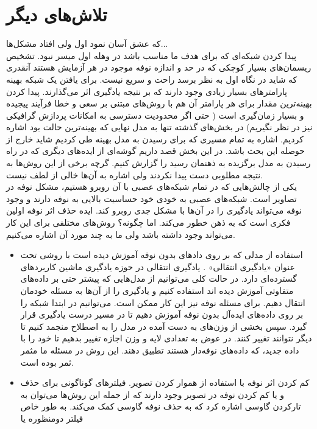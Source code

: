 {\section{تلاش‌های دیگر} 
که عشق آسان نمود اول ولی افتاد مشکل‌ها... \\
پیدا کردن شبکه‌ای که برای هدف ما مناسب باشد در وهله اول میسر نبود. تشخیص ریسمان‌های بسیار کوچکی که در حد و اندازه نوفه موجود در هر آزمایش 	هستند آنقدری که شاید در نگاه اول به نظر برسد راحت و سریع نیست. برای یافتن یک شبکه بهینه پارامترهای بسیار زیادی وجود دارند که بر نتیجه یادگیری اثر می‌گذارند. پیدا کردن بهینه‌ترین مقدار برای هر پارامتر آن هم با روش‌های مبتنی بر سعی و خطا فرآیند پیجیده و بسیار زمان‌گیری است ( حتی اگر محدودیت دسترسی به امکانات پردازش گرافیکی نیز در نظر نگیریم)  در بخش‌های گذشته تنها به مدل نهایی که بهینه‌ترین حالت بود اشاره کردیم. اشاره به تمام‌ مسیری که برای رسیدن به مدل بهینه طی کردیم شاید خارج از حوصله این بحث باشد. در این بخش قصد داریم گوشه‌ای از ایده‌های دیگری که در راه رسیدن به مدل برگزیده به ذهنمان رسید را گزارش کنیم. گرچه برخی از این روش‌ها به نتیجه مطلوبی دست پیدا نکردند ولی اشاره به آن‌ها خالی از لطف نیست. \\
یکی از چالش‌هایی که در تمام شبکه‌های عصبی با آن روبرو هستیم، مشکل نوفه در تصاویر است. شبکه‌های عصبی به خودی خود حساسیت بالایی به نوفه دارند و وجود نوفه می‌تواند یادگیری را در آن‌ها با مشکل جدی روبرو کند. ایده حذف اثر نوفه اولین فکری است که به ذهن خطور می‌کند. اما چگونه؟ روش‌های مختلفی برای این کار می‌تواند وجود داشته باشد ولی ما به چند مورد آن اشاره می‌کنیم. 
\begin{itemize}
	\item 
	استفاده از مدلی که بر روی داد‌های بدون نوفه آموزش دیده است با روشی تحت عنوان «یادگیری انتقالی»
	.
	یادگیری انتقالی در حوزه یادگیری ماشین کاربردهای گسترده‌ای دارد. در حالت کلی می‌توانیم از مدل‌هایی که پیشتر حتی بر داده‌های متفاوتی آموزش دیده اند استفاده کنیم و یادگیری را از آن‌ها به مسئله خودمان انتقال دهیم. برای مسئله نوفه نیز این کار ممکن است. می‌توانیم در ابتدا شبکه را بر روی داده‌های ایده‌آل بدون نوفه آموزش دهیم تا در مسیر درست یادگیری قرار گیرد. سپس بخشی از وزن‌های به دست آمده در مدل را به اصطلاح منجمد کنیم تا دیگر نتوانند تغییر کنند. در عوض به تعدادی لایه و وزن اجازه تغییر بدهیم تا خود را با داده جدید، که داده‌های نوفه‌دار هستند تطبیق دهند. این روش در مسئله ما مثمر ثمر بوده است.
	\item
	کم کردن اثر نوفه با استفاده از هموار کردن تصویر. فیلتر‌های گوناگونی برای حذف و یا کم کردن نوفه در تصویر وجود دارند که از جمله این روش‌ها می‌توان به تارکردن گاوسی 
	اشاره کرد که به حذف نوفه گاوسی کمک می‌کند. به طور خاص فیلتر دومنظوره یا

\end{itemize}}
